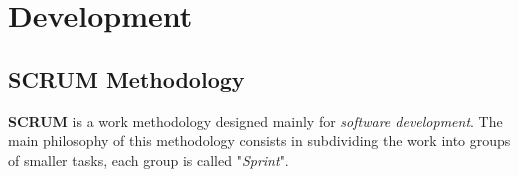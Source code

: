 \documentclass[a4paper, 12pt, english]{book}
\begin{document}







\cleardoublepage
\chapter{Development}

\section{SCRUM Methodology}
\label{sec:scrum}

\textbf{SCRUM} is a work methodology designed mainly for \textit{software development}. The main philosophy of this methodology consists in subdividing the work into groups of smaller tasks, each group is called "\textit{Sprint}".
\end{document}
